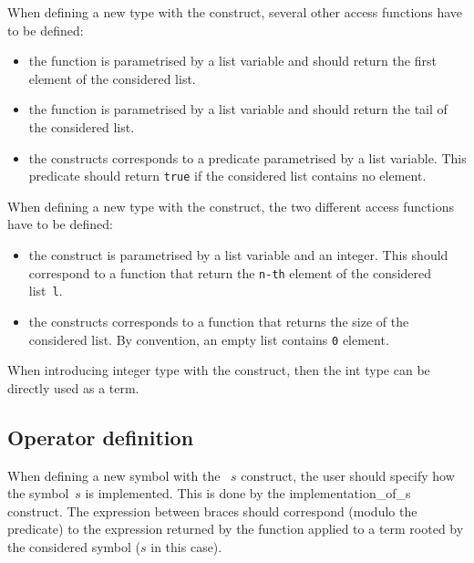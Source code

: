 \noindent\label{listdef}
When defining a new type with the  construct,
several other access functions have to be defined:
\begin{itemize}
\item\label{geth} the  function is parametrised by a list
  variable and should return the first element of the considered list.

\item\label{gett} the  function is parametrised by a list
  variable and should return the tail of the considered list.

\item\label{isempty} the  constructs corresponds to a
  predicate parametrised by a list variable.
  This predicate should return \texttt{true} if the considered list
  contains no element.
\end{itemize}

\noindent\label{arraydef}
When defining a new type with the  construct,
the two different access functions have to be defined:
\begin{itemize}
\item\label{gete} the  construct is parametrised by a list
  variable and an integer. This should correspond to a function that
  return the \texttt{n-th} element of the considered list~\texttt{l}.

\item\label{getsize} the  constructs corresponds to a function
  that returns the size of the considered list.
  By convention, an empty list contains \texttt{0} element.
\end{itemize}

\noindent\label{int}
When introducing integer type with the  construct, then
the int type can be directly used as a term.

\subsection{Operator definition}\label{opdef}

\noindent
When defining a new symbol with the ~$s$ construct, the user
should specify how the symbol~$s$ is implemented. This is done by the
 \lex{\{} implementation\_of\_s \lex{\}} construct.\label{fsym}
The expression between braces should correspond (modulo the
 predicate) to the expression returned by the
function  applied to a term rooted by the
considered symbol ($s$ in this case).  

